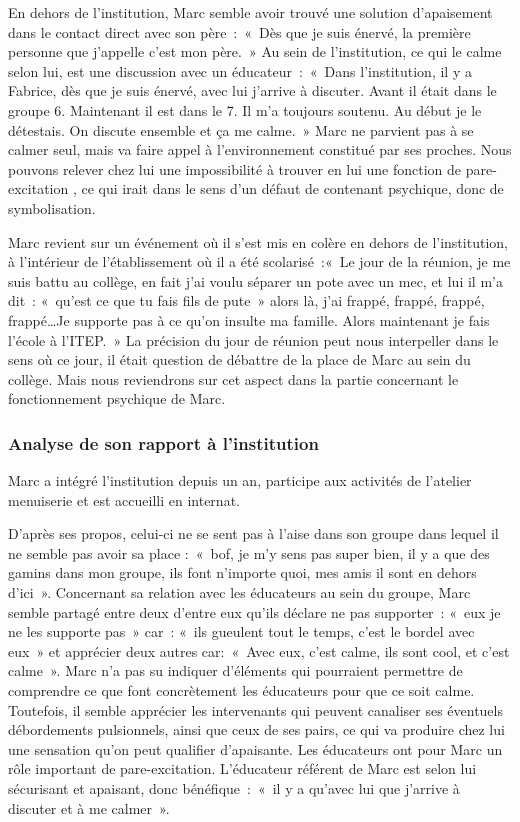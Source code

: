 \documentclass[12pt, a4paper]{book}
\begin{document}
\begin{spacing}{1.5}
En dehors de l'institution, Marc semble avoir trouvé une solution d'apaisement dans le contact direct avec son père : « Dès que je suis énervé, la première personne que j'appelle c'est mon père. » Au sein de l'institution, ce qui le calme selon lui, est une discussion avec un éducateur : « Dans l'institution, il y a Fabrice, dès que je suis énervé, avec lui j'arrive à discuter. Avant il était dans le groupe 6. Maintenant il est dans le 7. Il m'a toujours soutenu. Au début je le détestais. On discute ensemble et ça me calme. » Marc ne parvient pas à se calmer seul, mais va faire appel à l'environnement constitué par ses proches. Nous pouvons relever chez lui une impossibilité à trouver en lui une fonction de pare-excitation , ce qui irait dans le sens d'un défaut de contenant psychique, donc de symbolisation.

Marc revient sur un événement où il s'est mis en colère en dehors de l'institution, à l'intérieur de l'établissement où il a été scolarisé :« Le jour de la réunion, je me suis battu au collège, en fait j'ai voulu séparer un pote avec un mec, et lui il m'a dit : « qu'est ce que tu fais fils de pute » alors là, j'ai frappé, frappé, frappé, frappé…Je supporte pas à ce qu'on insulte ma famille. Alors maintenant je fais l'école à l'ITEP. » La précision du jour de réunion peut nous interpeller dans le sens où ce jour, il était question de débattre de la place de Marc au sein du collège. Mais nous reviendrons sur cet aspect dans la partie concernant le fonctionnement psychique de Marc.

\subsubsection{Analyse de son rapport à l'institution}

Marc a intégré l'institution depuis un an, participe aux activités de l'atelier menuiserie et est accueilli en internat.

D'après ses propos, celui-ci ne se sent pas à l'aise dans son groupe dans lequel  il ne semble pas avoir sa place : « bof, je m'y sens pas super bien, il y a que des gamins dans mon groupe, ils font n'importe quoi, mes amis il sont en dehors d'ici ». Concernant sa relation avec les éducateurs au sein du groupe, Marc semble partagé entre deux d'entre eux qu'ils déclare ne pas supporter : « eux je ne les supporte pas » car : « ils gueulent tout le temps, c'est le bordel avec eux » et apprécier deux autres car: « Avec eux, c'est calme, ils sont cool, et c'est calme ». Marc n'a pas su indiquer d'éléments qui pourraient permettre de comprendre ce que font concrètement les éducateurs pour que ce soit calme. Toutefois, il semble apprécier les intervenants qui peuvent canaliser ses éventuels débordements pulsionnels, ainsi que ceux de ses pairs, ce qui va produire chez lui une sensation qu'on peut qualifier d'apaisante. Les éducateurs ont pour Marc un rôle important de pare-excitation. L'éducateur référent de Marc est selon lui sécurisant et apaisant, donc bénéfique : « il y a qu'avec lui que j'arrive à discuter et à me calmer ».


\end{spacing}
\end{document}
